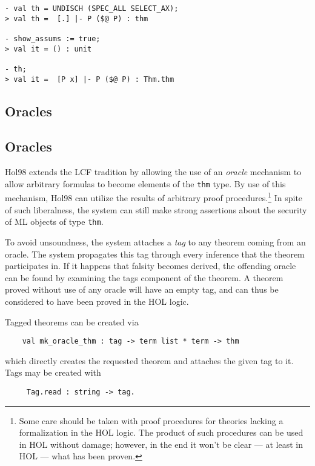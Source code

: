\setcounter{sessioncount}{1}
\begin{session}\begin{verbatim}
- val th = UNDISCH (SPEC_ALL SELECT_AX);
> val th =  [.] |- P ($@ P) : thm

- show_assums := true;
> val it = () : unit

- th;
> val it =  [P x] |- P ($@ P) : Thm.thm
\end{verbatim}\end{session}
\subsection{Oracles}

\subsection{Oracles}

Hol98 extends the LCF tradition by allowing the use of an \emph {oracle}
mechanism to allow arbitrary formulas to become elements of the
\verb+thm+ type. By use of this mechanism, Hol98 can utilize the results
of arbitrary proof procedures.\footnote{Some care should be taken with
proof procedures for theories lacking a formalization in the HOL
logic. The product of such procedures can be used in HOL without damage;
however, in the end it won't be clear --- at least in HOL --- what has
been proven.} In spite of such liberalness, the system can still make
strong assertions about the security of ML objects of type \verb+thm+.

To avoid unsoundness, the system attaches a \emph{tag} to any theorem
coming from an oracle. The system propagates this tag through every
inference that the theorem participates in. If it happens that falsity
becomes derived, the offending oracle can be found by examining the tags
component of the theorem. A theorem proved without use of any oracle
will have an empty tag, and can thus be considered to have been proved
in the HOL logic.

Tagged theorems can be created via
\begin{hol}
\begin{verbatim}
    val mk_oracle_thm : tag -> term list * term -> thm
\end{verbatim}\end{hol}

which directly creates the requested theorem and attaches the given tag to
it. Tags may be created with
\begin{hol}
\begin{verbatim}
     Tag.read : string -> tag.
\end{verbatim}
\end{hol}

